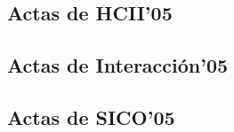
\subsection{Actas de HCII’05}
      
      

\subsection{Actas de Interacción’05}
       
      

\subsection{Actas de SICO’05}
       
      
